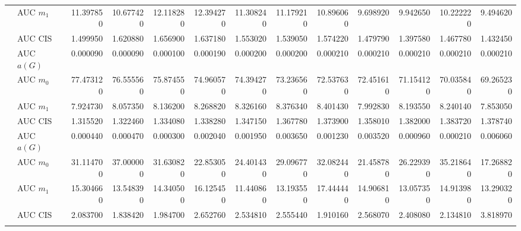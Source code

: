 \begin{table}[htbp]
\begin{tabular}{llrrrrrrrrrrr}
    & AUC $m_1$ & 11.397850 & 10.677420 & 12.118280 & 12.394270 & 11.308240 & 11.179210 & 10.896060 & 9.698920 & 9.942650 & 10.222220 & 9.494620 \\
    & AUC CIS & 1.499950 & 1.620880 & 1.656900 & 1.637180 & 1.553020 & 1.539050 & 1.574220 & 1.479790 & 1.397580 & 1.467780 & 1.432450 \\
    \addlinespace
    \multirow{4}{*}{degree} & AUC $a(G)$ & 0.000090 & 0.000090 & 0.000100 & 0.000190 & 0.000200 & 0.000200 & 0.000210 & 0.000210 & 0.000210 & 0.000210 & 0.000210 \\
    & AUC $m_0$ & 77.473120 & 76.555560 & 75.874550 & 74.960570 & 74.394270 & 73.236560 & 72.537630 & 72.451610 & 71.154120 & 70.035840 & 69.265230 \\
    & AUC $m_1$ & 7.924730 & 8.057350 & 8.136200 & 8.268820 & 8.326160 & 8.376340 & 8.401430 & 7.992830 & 8.193550 & 8.240140 & 7.853050 \\
    & AUC CIS & 1.315520 & 1.322460 & 1.334080 & 1.338280 & 1.347150 & 1.367780 & 1.373900 & 1.358010 & 1.382000 & 1.383720 & 1.378740 \\
    \addlinespace
    \multirow{4}{*}{random} & AUC $a(G)$ & 0.000440 & 0.000470 & 0.000300 & 0.002040 & 0.001950 & 0.003650 & 0.001230 & 0.003520 & 0.000960 & 0.000210 & 0.006060 \\
    & AUC $m_0$ & 31.114700 & 37.000000 & 31.630820 & 22.853050 & 24.401430 & 29.096770 & 32.082440 & 21.458780 & 26.229390 & 35.218640 & 17.268820 \\
    & AUC $m_1$ & 15.304660 & 13.548390 & 14.340500 & 16.125450 & 11.440860 & 13.193550 & 17.444440 & 14.906810 & 13.057350 & 14.913980 & 13.290320 \\
    & AUC CIS & 2.083700 & 1.838420 & 1.984700 & 2.652760 & 2.534810 & 2.555440 & 1.910160 & 2.568070 & 2.408080 & 2.134810 & 3.818970 \\
    \addlinespace
    \bottomrule
  \end{tabular}
\end{table}

